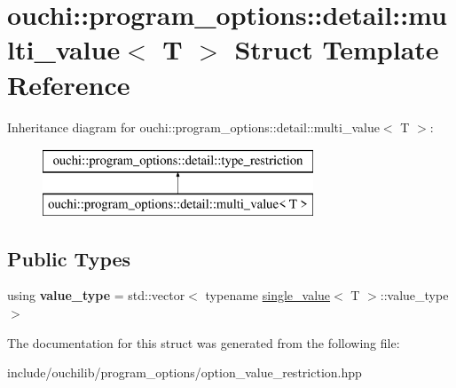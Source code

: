 \hypertarget{structouchi_1_1program__options_1_1detail_1_1multi__value}{}\section{ouchi\+::program\+\_\+options\+::detail\+::multi\+\_\+value$<$ T $>$ Struct Template Reference}
\label{structouchi_1_1program__options_1_1detail_1_1multi__value}
Inheritance diagram for ouchi\+::program\+\_\+options\+::detail\+::multi\+\_\+value$<$ T $>$\+:\begin{figure}[H]
\begin{center}
\leavevmode
\includegraphics[height=2.000000cm]{structouchi_1_1program__options_1_1detail_1_1multi__value}
\end{center}
\end{figure}
\subsection*{Public Types}
\begin{DoxyCompactItemize}
\item 
\mbox{\label{structouchi_1_1program__options_1_1detail_1_1multi__value_a4faaa1976c4e0d17ce9c17db79ee750e}} 
using {\bfseries value\+\_\+type} = std\+::vector$<$ typename \mbox{\hyperlink{structouchi_1_1program__options_1_1detail_1_1single__value}{single\+\_\+value}}$<$ T $>$\+::value\+\_\+type $>$
\end{DoxyCompactItemize}


The documentation for this struct was generated from the following file\+:\begin{DoxyCompactItemize}
\item 
include/ouchilib/program\+\_\+options/option\+\_\+value\+\_\+restriction.\+hpp\end{DoxyCompactItemize}
